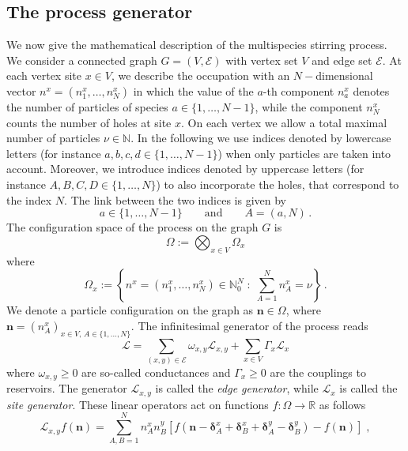 \documentclass[10pt]{article}
\numberwithin{equation}{section}
\numberwithin{equation}{subsection}
\newcommand{\co}{\;,}
\newcommand{\twoj}{\nu}
\begin{document}
\subsection{The process generator}\label{subsectionGeneratorStr}
We now give the mathematical description of the multispecies stirring process.
We consider a connected graph $G=(V,\mathcal{E})$ with vertex set $V$ and edge set $\mathcal{E}$.
At each vertex site $x\in V$, we describe the occupation with an $N-$dimensional vector $n^{x}=(n_{1}^{x},\ldots,n_{N}^{x})$ in which the value of the $a$-th component $n_{a}^{x}$ {denotes the number of particles of species $a\in \{1,\ldots,N-1\}$, while the component $n_{N}^{x}$ counts the number of holes at site $x$.} On each vertex we {allow a total maximal number of particles $\nu\in \mathbb{N}$}. {In the following we use indices denoted by lowercase letters (for instance $a,b,c,d\in \{1,\ldots,N-1\}$) when only particles are taken into account. Moreover, we introduce indices denoted by uppercase letters (for instance $A,B,C,D\in\{1,\ldots,N\}$)  to also incorporate the holes, that correspond to the index $N$. The link between the two indices is given by 
\begin{equation}
	a\in \{1,\ldots,N-1\}\qquad \text{and}\qquad A=(a,N)\,.
	\end{equation} 
} 
The configuration space of the process on the graph $G$ is 
\begin{equation}\label{stateSpace}
    \Omega:=\bigotimes_{x\in V} \Omega_{x}
\end{equation}
where
\begin{equation}
\Omega_{x}:=\left\{n^x=(n_{1}^{x},\ldots,n_{N}^{x})\in\mathbb{N}_0^{N}\;:\; \sum_{A=1}^{N}n_{A}^{x}=\twoj\right\}\,.
\end{equation}
We denote a particle configuration on the graph as $\bm{n}\in \Omega$, where $\bm{n}=(n_{A}^{x})_{x\in V,\,A\in\{1,\ldots,N\}}$.
The infinitesimal generator of the process reads
\begin{equation}\label{Generator}
    \mathcal{L}=\sum_{(x,y)\in \mathcal{E}}\omega_{x,y}\mathcal{L}_{x,y}+\sum_{x\in V}\Gamma_{x}\mathcal{L}_{x}
\end{equation}
where  $ \omega_{x,y}\geq 0$ are so-called conductances and $\Gamma_{x}\geq 0$ are the couplings to reservoirs. 
The generator $\mathcal{L}_{x,y}$ is called the \textit{edge generator}, while $\mathcal{L}_{x}$ is called the \textit{site generator}. These linear operators act on functions $f:\Omega\to \mathbb{R}$ as follows
\begin{equation}\label{edgeGenerator}
\mathcal{L}_{x,y}f(\bm{n})=\sum_{A,B=1}^{N}n_{A}^{x}n_{B}^{y}\left[f(\bm{n}-\bm{\delta}^{x}_{A}+\bm{\delta}_{B}^{x}+\bm{\delta}_{A}^{y}-\bm{\delta}_{B}^{y})-f(\bm{n})\right]\co
\end{equation}
\end{document}
